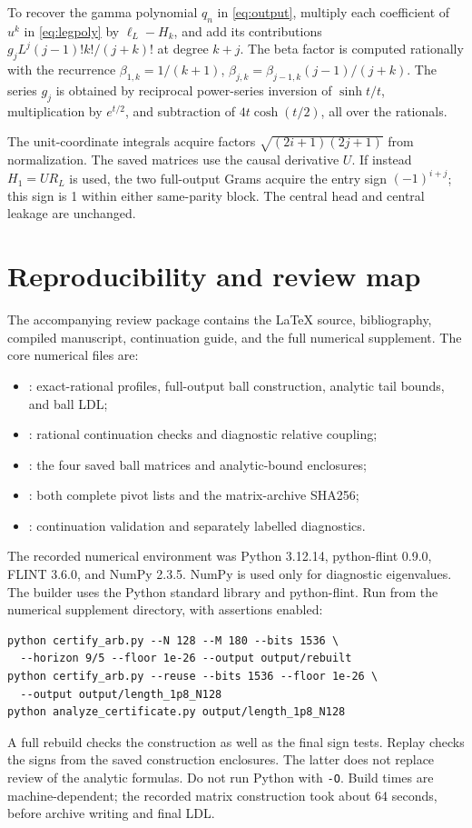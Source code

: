 \documentclass[11pt]{article}
\numberwithin{equation}{section}
\theoremstyle{definition}
\theoremstyle{remark}
\begin{document}
To recover the gamma polynomial $q_n$ in \eqref{eq:output}, multiply each
coefficient of $u^k$ in \eqref{eq:legpoly} by $\ell_L-H_k$, and add
its contributions $g_jL^j(j-1)!k!/(j+k)!$ at degree $k+j$.
The beta factor is computed rationally with the recurrence
$\beta_{1,k}=1/(k+1)$,
$\beta_{j,k}=\beta_{j-1,k}(j-1)/(j+k)$.
The series $g_j$ is obtained by reciprocal power-series inversion of
$\sinh t/t$, multiplication by $e^{t/2}$, and subtraction of
$4t\cosh(t/2)$, all over the rationals.

The unit-coordinate integrals acquire factors $\sqrt{(2i+1)(2j+1)}$ from
normalization. The saved matrices use the causal derivative $U$.
If instead $H_1=UR_L$ is used, the two full-output Grams acquire the
entry sign $(-1)^{i+j}$; this sign is 1 within either same-parity block.
The central head and central leakage are unchanged.

\section{Reproducibility and review map}\label{app:reproduce}

The accompanying review package contains the LaTeX source, bibliography,
compiled manuscript, continuation guide, and the full numerical supplement.
The core numerical files are:
\begin{itemize}
\item {}: exact-rational profiles, full-output ball
  construction, analytic tail bounds, and ball LDL;
\item {}: rational continuation checks and
  diagnostic relative coupling;
\item {}: the four saved ball matrices and
  analytic-bound enclosures;
\item {}: both complete pivot lists and
  the matrix-archive SHA256;
\item {}: continuation validation and separately labelled
  diagnostics.
\end{itemize}

The recorded numerical environment was Python 3.12.14, python-flint 0.9.0,
FLINT 3.6.0, and NumPy 2.3.5. NumPy is used only for diagnostic eigenvalues.
The builder uses the Python standard library and python-flint. Run from
the numerical supplement directory, with assertions enabled:
\begin{verbatim}
python certify_arb.py --N 128 --M 180 --bits 1536 \
  --horizon 9/5 --floor 1e-26 --output output/rebuilt
python certify_arb.py --reuse --bits 1536 --floor 1e-26 \
  --output output/length_1p8_N128
python analyze_certificate.py output/length_1p8_N128
\end{verbatim}
A full rebuild checks the construction as well as the final sign tests.
Replay checks the signs from the saved construction enclosures. The latter
does not replace review of the analytic formulas. Do not run Python with
\texttt{-O}. Build times are machine-dependent; the recorded matrix
construction took about 64 seconds, before archive writing and final LDL.
\end{document}
